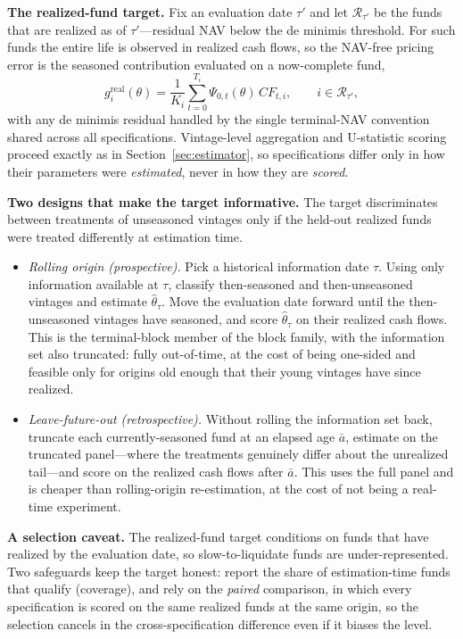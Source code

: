 \documentclass[11pt]{article}
\begin{document}
\textbf{The realized-fund target.} Fix an evaluation date \(\tau'\) and let \(\mathcal R_{\tau'}\) be the funds that are realized as of \(\tau'\)---residual NAV below the de minimis threshold. For such funds the entire life is observed in realized cash flows, so the NAV-free pricing error is the seasoned contribution evaluated on a now-complete fund,
\[
g_i^{\mathrm{real}}(\theta)
=
\frac{1}{K_i}\sum_{t=0}^{T_i}\Psi_{0,t}(\theta)\,CF_{t,i},
\qquad i\in\mathcal R_{\tau'},
\]
with any de minimis residual handled by the single terminal-NAV convention shared across all specifications. Vintage-level aggregation and U-statistic scoring proceed exactly as in Section~\ref{sec:estimator}, so specifications differ only in how their parameters were \emph{estimated}, never in how they are \emph{scored}.

\textbf{Two designs that make the target informative.} The target discriminates between treatments of unseasoned vintages only if the held-out realized funds were treated differently at estimation time.
\begin{itemize}
\item \emph{Rolling origin (prospective).} Pick a historical information date \(\tau\). Using only information available at \(\tau\), classify then-seasoned and then-unseasoned vintages and estimate \(\hat\theta_\tau\). Move the evaluation date forward until the then-unseasoned vintages have seasoned, and score \(\hat\theta_\tau\) on their realized cash flows. This is the terminal-block member of the block family, with the information set also truncated: fully out-of-time, at the cost of being one-sided and feasible only for origins old enough that their young vintages have since realized.
\item \emph{Leave-future-out (retrospective).} Without rolling the information set back, truncate each currently-seasoned fund at an elapsed age \(\bar a\), estimate on the truncated panel---where the treatments genuinely differ about the unrealized tail---and score on the realized cash flows after \(\bar a\). This uses the full panel and is cheaper than rolling-origin re-estimation, at the cost of not being a real-time experiment.
\end{itemize}

\textbf{A selection caveat.} The realized-fund target conditions on funds that have realized by the evaluation date, so slow-to-liquidate funds are under-represented. Two safeguards keep the target honest: report the share of estimation-time funds that qualify (coverage), and rely on the \emph{paired} comparison, in which every specification is scored on the same realized funds at the same origin, so the selection cancels in the cross-specification difference even if it biases the level.
\end{document}
